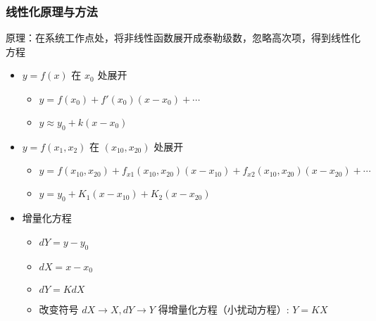 \documentclass{article}
\begin{document}
\begin{frame}
\frametitle{线性化原理与方法}
\label{sec-1-1-3}

原理：在系统工作点处，将非线性函数展开成泰勒级数，忽略高次项，得到线性化方程
\begin{itemize}
\item <2->$y=f(x)$ 在 $x_0$ 处展开
\begin{itemize}
\item <3->$y =f(x_0)+f'(x_0)(x-x_0)+\cdots$
\item <3->$y \approx   y_0 + k(x-x_0)$
\end{itemize}
\item <4->$y=f(x_1,x_2)$ 在 $(x_{10},x_{20})$ 处展开
\begin{itemize}
\item <5->$y = f(x_{10},x_{20})+f_{x1}(x_{10},x_{20})(x-x_{10})+f_{x2}(x_{10},x_{20})(x-x_{20})+\cdots$
\item <5->$y = y_0+K_1(x-x_{10})+K_2(x-x_{20})$
\end{itemize}
\item <6-> 增量化方程
\begin{itemize}
\item <7-> $dY=y-y_0$
\item <7-> $dX=x-x_0$
\item <8-> $dY=K dX$
\item <8-> 改变符号 $dX\rightarrow X,dY\rightarrow Y$ 得增量化方程（小扰动方程）: $Y=K X$
\end{itemize}
\end{itemize}
\end{frame}
\end{document}
